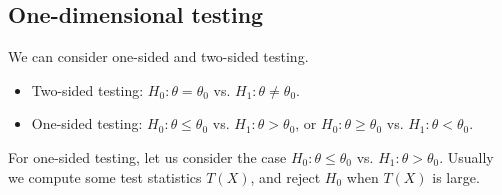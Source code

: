 \documentclass[11pt,letterpaper]{article}
\numberwithin{assumption}{lecture}
\numberwithin{theorem}{lecture}
\numberwithin{proposition}{lecture}
\numberwithin{lemma}{lecture}
\numberwithin{claim}{lecture}
\numberwithin{corollary}{lecture}
\numberwithin{definition}{lecture}
\numberwithin{conjecture}{lecture}
\numberwithin{remark}{lecture}
\numberwithin{example}{lecture}
\numberwithin{equation}{lecture}
\begin{document}
\subsection{One-dimensional testing}
We can consider one-sided and two-sided testing.
\begin{itemize}
  \item Two-sided testing: $H_0: \theta = \theta_0$ vs. $H_1: \theta \neq \theta_0$.
  \item One-sided testing: $H_0: \theta \leq \theta_0$ vs. $H_1: \theta > \theta_0$, or $H_0: \theta \geq \theta_0$ vs. $H_1: \theta < \theta_0$.
\end{itemize}
For one-sided testing, let us consider the case $H_0: \theta \leq \theta_0$ vs. $H_1: \theta > \theta_0$. Usually we compute some test statistics $T(X)$, and reject $H_0$ when $T(X)$ is large.
\end{document}
